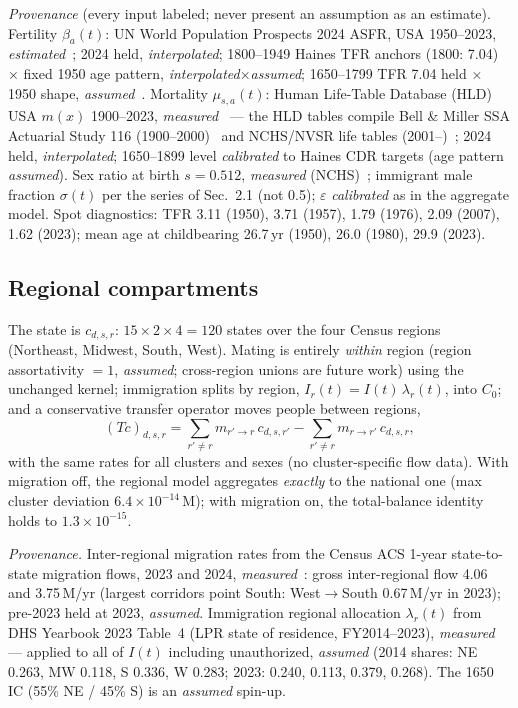 \documentclass[11pt,a4paper]{article}
\begin{document}
\emph{Provenance} (every input labeled; never present an assumption as an
estimate).  Fertility $\beta_a(t)$: UN World Population Prospects 2024
ASFR, USA 1950--2023, \emph{estimated}~\cite{unwpp-2024}; 2024 held,
\emph{interpolated}; 1800--1949 Haines TFR anchors (1800: 7.04) $\times$
fixed 1950 age pattern, \emph{interpolated}$\times$\emph{assumed};
1650--1799 TFR 7.04 held $\times$ 1950 shape, \emph{assumed}~\cite{haines}.
Mortality $\mu_{s,a}(t)$: Human Life-Table Database (HLD) USA $m(x)$
1900--2023, \emph{measured}~\cite{hld} --- the HLD tables compile Bell \&
Miller SSA Actuarial Study 116 (1900--2000)~\cite{bell-miller} and
NCHS/NVSR life tables (2001--)~\cite{nchs-lifetables}; 2024 held,
\emph{interpolated}; 1650--1899 level \emph{calibrated} to Haines CDR
targets (age pattern \emph{assumed}).  Sex ratio at birth $s=0.512$,
\emph{measured} (NCHS)~\cite{nchs-natality}; immigrant male fraction
$\sigma(t)$ per the series of Sec.~2.1 (not 0.5); $\varepsilon$ \emph{calibrated} as in the
aggregate model.  Spot diagnostics: TFR 3.11 (1950), 3.71 (1957), 1.79
(1976), 2.09 (2007), 1.62 (2023); mean age at childbearing 26.7\,yr
(1950), 26.0 (1980), 29.9 (2023).

\subsection{Regional compartments}
\label{sec:regional}
The state is $c_{d,s,r}$: $15\times2\times4=120$ states over the four
Census regions (Northeast, Midwest, South, West).  Mating is entirely
\emph{within} region (region assortativity ${}=1$, \emph{assumed};
cross-region unions are future work) using the unchanged kernel;
immigration splits by region, $I_r(t)=I(t)\,\lambda_r(t)$, into $C_0$; and
a conservative transfer operator moves people between regions,
\[
  (Tc)_{d,s,r}
  =\sum_{r'\ne r}m_{r'\to r}\,c_{d,s,r'}
   -\sum_{r'\ne r}m_{r\to r'}\,c_{d,s,r},
\]
with the same rates for all clusters and sexes (no cluster-specific flow
data).  With migration off, the regional model aggregates \emph{exactly}
to the national one (max cluster deviation $6.4\times10^{-14}$\,M); with
migration on, the total-balance identity holds to $1.3\times10^{-15}$.

\emph{Provenance.}  Inter-regional migration rates from the Census ACS
1-year state-to-state migration flows, 2023 and 2024,
\emph{measured}~\cite{acs-migration}: gross inter-regional flow 4.06 and
3.75\,M/yr (largest corridors point South: West$\to$South 0.67\,M/yr in
2023); pre-2023 held at 2023, \emph{assumed}.  Immigration regional
allocation $\lambda_r(t)$ from DHS Yearbook 2023 Table~4 (LPR state of
residence, FY2014--2023), \emph{measured}~\cite{dhs-table4} --- applied to
all of $I(t)$ including unauthorized, \emph{assumed} (2014 shares: NE
0.263, MW 0.118, S 0.336, W 0.283; 2023: 0.240, 0.113, 0.379, 0.268).
The 1650 IC (55\% NE / 45\% S) is an \emph{assumed} spin-up.
\end{document}

